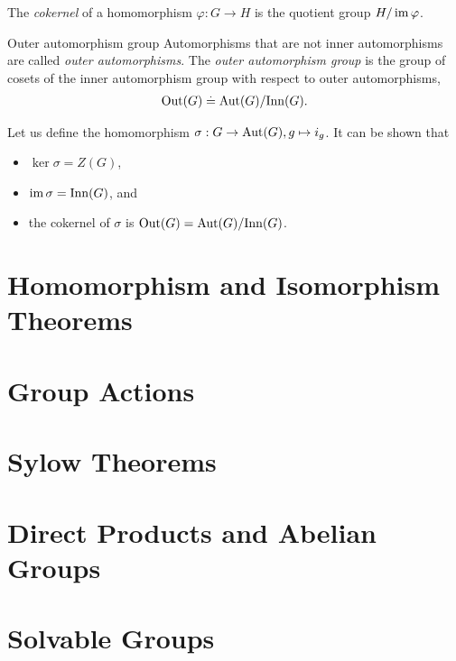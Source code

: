 \begin{defn}[Cokernel]
The \emph{cokernel} of a homomorphism ${\varphi : G \to H}$ is the quotient group $H/\operatorname*{im}{\varphi}$.
\end{defn}

\begin{ex}{Outer automorphism group}{}
Automorphisms that are not inner automorphisms are called \emph{outer automorphisms}. The \emph{outer automorphism group} is the group of cosets of the inner automorphism group with respect to outer automorphisms, \begin{align}
    \mathrm{Out}(G) \overset{.}{=} \mathrm{Aut}(G)/\mathrm{Inn}(G).
\end{align}

Let us define the homomorphism ${\sigma : G \to \mathrm{Aut}(G), g \mapsto i_g}$. It can be shown that \vspace{-10pt}\begin{itemize}
    \item $\ker{\sigma} = Z(G)$,
    \item $\operatorname*{im}{\sigma} = \mathrm{Inn}(G)$, and
    \item the cokernel of $\sigma$ is $\mathrm{Out}(G) = \mathrm{Aut}(G)/\mathrm{Inn}(G)$.
\end{itemize}
\end{ex}

\chapter{Homomorphism and Isomorphism Theorems}
\chapter{Group Actions}\label{sec:groups:actions}
\chapter{Sylow Theorems}
\chapter{Direct Products and Abelian Groups}
\chapter{Solvable Groups}
